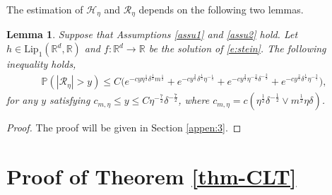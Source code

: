 \documentclass[12pt]{amsart}
\newtheorem{lemma}[theorem]{Lemma}
\theoremstyle{definition}
\theoremstyle{remark}
\numberwithin{equation}{section}
\newcommand{\R}{\mathbb{R}}\newcommand{\RR}{\mathbb{R}}
\newcommand{\PP}{\mathbb{P}}
\begin{document}
The estimation of $\mathcal H_\eta$ and $\mathcal R_\eta$ depends on the following two lemmas.
\begin{lemma}\label{lem:R}
Suppose that Assumptions \ref{assu1} and \ref{assu2} hold. Let 
$h\in \mathrm{Lip}_1(\R^d,\R)$ and $f:\R^d\to\R$ be the solution
of \eqref{e:stein}. The following inequality holds, 
\begin{eqnarray*}
\PP(|\mathcal{R}_\eta|>y)\le C\Big( e^{-cy\eta^{\frac12}\delta^\frac12m^{\frac12} }
+e^{-cy^\frac25\delta^\frac15 \eta^{-\frac1{5}}}
+e^{-cy^{\frac29}\eta^{-\frac29}\delta^{-\frac29} }
+e^{-cy^{\frac27}\delta^{\frac17}\eta^{-\frac37}}\Big),
\end{eqnarray*}
for any $y$ satisfying $c_{m,\eta}\le y\le C\eta^{-\frac72}\delta^{-\frac72}$, where $c_{m,\eta}=c(\eta^{\frac12}\delta^{-\frac12}\vee m^{\frac12}\eta\delta)$.
\end{lemma}	
\begin{proof}
The proof will be given in Section \ref{appen:3}.	
\end{proof}


\iffalse
\section{Proof of Theorem \ref{thm-CLT}}\label{sec:4}
\end{document}
